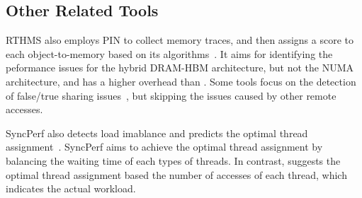 



\subsection{Other Related Tools}
RTHMS also employs PIN to collect memory traces, and then assigns a score to each object-to-memory based on its algorithms~\cite{RTHMS}. It aims for identifying the peformance issues for the hybrid DRAM-HBM architecture, but not the NUMA architecture, and has a higher overhead than \NP{}. Some tools focus on the detection of false/true sharing issues~\cite{Predator, Cheetah, DBLP:conf/ppopp/ChabbiWL18, helm2019perfmemplus}, but skipping the issues caused by other remote accesses. 

SyncPerf also detects load imablance and predicts the optimal thread assignment~\cite{SyncPerf}. SyncPerf aims to achieve the optimal thread assignment by balancing the waiting time of each types of threads. In contrast, \NP{} suggests the optimal thread assignment based  the number of accesses of each thread, which indicates the actual workload. 





